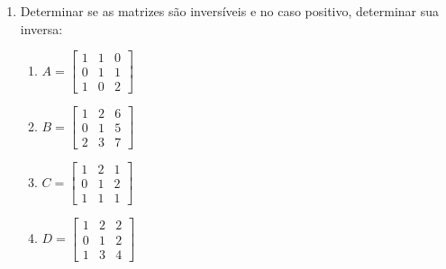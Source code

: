 \documentclass[oneside,a4paper,12pt]{article}
\begin{document}
\begin{enumerate}

	\item Determinar se as matrizes são inversíveis e no caso positivo, determinar sua inversa:
	\begin{multicols}{2}
	\begin{enumerate}
		\item $A=\left[
				\begin{array}{ccc}
				1	&	1	&	0	\\
				0	&	1	&	1	\\
				1	&	0	&	2
				\end{array}
				\right]
				$
		\item $B=\left[
		\begin{array}{ccc}
		1	&	2	&	6	\\
		0	&	1	&	5	\\
		2	&	3	&	7
		\end{array}
		\right]
		$
		\item $C=\left[
		\begin{array}{ccc}
		1	&	2	&	1	\\
		0	&	1	&	2	\\
		1	&	1	&	1
		\end{array}
		\right]
		$
		\item $D=\left[
		\begin{array}{ccc}
		1	&	2	&	2	\\
		0	&	1	&	2	\\
		1	&	3	&	4
		\end{array}
		\right]
		$
	\end{enumerate}
	\end{multicols}




\end{enumerate}
\end{document}
